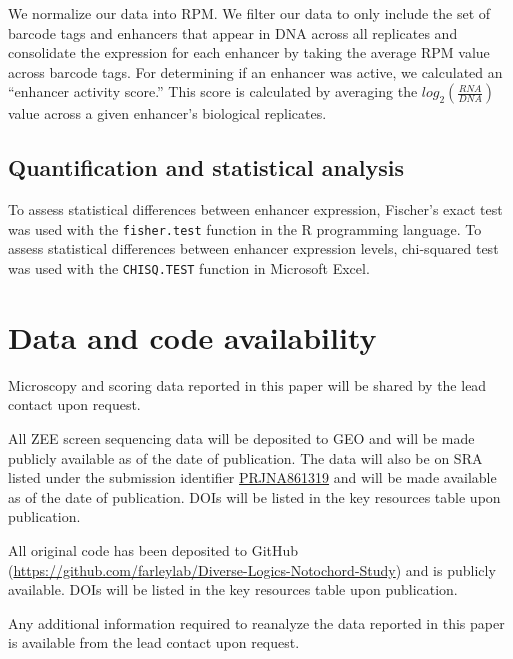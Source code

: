 We normalize our data into RPM.  We filter our data to only include the set of barcode tags and enhancers that appear in DNA across all replicates and consolidate the expression for each enhancer by taking the average RPM value across barcode tags. For determining if an enhancer was active, we calculated an “enhancer activity score.” This score is calculated by averaging the $log_2({\frac{RNA}{DNA}})$ value across a given enhancer’s biological replicates. 

\subsection{Quantification and statistical analysis}

To assess statistical differences between enhancer expression, Fischer’s exact test was used with the \verb|fisher.test| function in the R programming language. To assess statistical differences between enhancer expression levels, chi-squared test was used with the \verb|CHISQ.TEST| function in Microsoft Excel.

\section{Data and code availability}

Microscopy and scoring data reported in this paper will be shared by the lead contact upon request.

All ZEE screen sequencing data will be deposited to GEO and will be made publicly available as of the date of publication. The data will also be on SRA listed under the submission identifier \href{https://www.ncbi.nlm.nih.gov/sra/PRJNA861319}{PRJNA861319} and will be made available as of the date of publication. DOIs will be listed in the key resources table upon publication. 

All original code has been deposited to GitHub (\href{https://github.com/farleylab/Diverse-Logics-Notochord-Study}{https://github.com/farleylab/Diverse-Logics-Notochord-Study}) and is publicly available. DOIs will be listed in the key resources table upon publication. 

Any additional information required to reanalyze the data reported in this paper is available from the lead contact upon request. 

